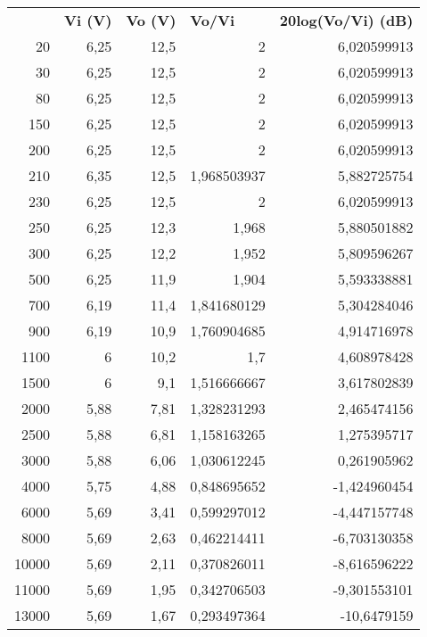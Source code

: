 \begin{itemize}
		\begin{table}[htbp]
			\centering
			\begin{tabular}{rrrrr}
				\rowcolor[rgb]{ .839,  .863,  .894} \multicolumn{1}{l}{\textbf{f (Hz)}} & \multicolumn{1}{l}{\textbf{Vi (V)}} & \multicolumn{1}{l}{\textbf{Vo (V)}} & \multicolumn{1}{l}{\textbf{Vo/Vi}} & \multicolumn{1}{l}{\textbf{20log(Vo/Vi) (dB)}} \\
				20    & 6,25  & 12,5  & 2     & 6,020599913 \\
				30    & 6,25  & 12,5  & 2     & 6,020599913 \\
				80    & 6,25  & 12,5  & 2     & 6,020599913 \\
				150   & 6,25  & 12,5  & 2     & 6,020599913 \\
				200   & 6,25  & 12,5  & 2     & 6,020599913 \\
				210   & 6,35  & 12,5  & 1,968503937 & 5,882725754 \\
				230   & 6,25  & 12,5  & 2     & 6,020599913 \\
				250   & 6,25  & 12,3  & 1,968 & 5,880501882 \\
				300   & 6,25  & 12,2  & 1,952 & 5,809596267 \\
				500   & 6,25  & 11,9  & 1,904 & 5,593338881 \\
				700   & 6,19  & 11,4  & 1,841680129 & 5,304284046 \\
				900   & 6,19  & 10,9  & 1,760904685 & 4,914716978 \\
				1100  & 6     & 10,2  & 1,7   & 4,608978428 \\
				1500  & 6     & 9,1   & 1,516666667 & 3,617802839 \\
				2000  & 5,88  & 7,81  & 1,328231293 & 2,465474156 \\
				2500  & 5,88  & 6,81  & 1,158163265 & 1,275395717 \\
				3000  & 5,88  & 6,06  & 1,030612245 & 0,261905962 \\
				4000  & 5,75  & 4,88  & 0,848695652 & -1,424960454 \\
				6000  & 5,69  & 3,41  & 0,599297012 & -4,447157748 \\
				8000  & 5,69  & 2,63  & 0,462214411 & -6,703130358 \\
				10000 & 5,69  & 2,11  & 0,370826011 & -8,616596222 \\
				11000 & 5,69  & 1,95  & 0,342706503 & -9,301553101 \\
				13000 & 5,69  & 1,67  & 0,293497364 & -10,6479159 \\

\end{tabular}
\end{table}
\end{itemize}
